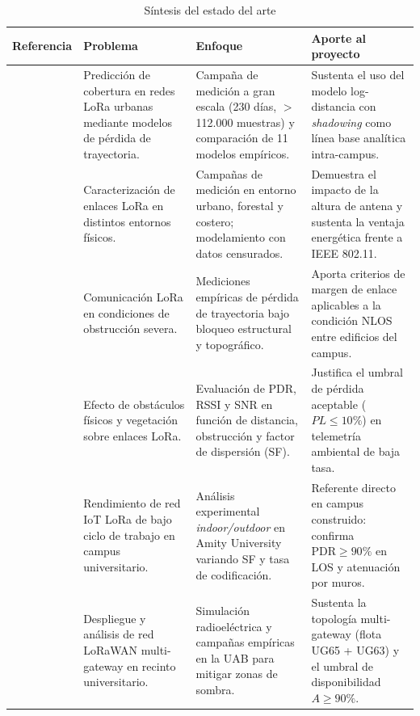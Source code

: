\documentclass[12pt,oneside,openany,spanish,oldfontcommands]{memoir}
\begin{document}
\begin{table}[!htbp]
\centering
\caption{Síntesis del estado del arte}
\label{tab:estado-arte}
\scriptsize
\begin{tabularx}{\textwidth}{p{2.5cm} X X X}
\toprule
\textbf{Referencia} & \textbf{Problema} & \textbf{Enfoque} & \textbf{Aporte al proyecto}\\
\midrule
\textcite{rademacher2021}
&
Predicción de cobertura en redes LoRa urbanas mediante modelos de pérdida de trayectoria.
&
Campaña de medición a gran escala (230 días, $>$112.000 muestras) y comparación de 11 modelos empíricos.
&
Sustenta el uso del modelo log-distancia con \textit{shadowing} como línea base analítica intra-campus.
\\
\midrule
\textcite{callebaut2020}
&
Caracterización de enlaces LoRa en distintos entornos físicos.
&
Campañas de medición en entorno urbano, forestal y costero; modelamiento con datos censurados.
&
Demuestra el impacto de la altura de antena y sustenta la ventaja energética frente a IEEE 802.11.
\\
\midrule
\textcite{bianco2021}
&
Comunicación LoRa en condiciones de obstrucción severa.
&
Mediciones empíricas de pérdida de trayectoria bajo bloqueo estructural y topográfico.
&
Aporta criterios de margen de enlace aplicables a la condición NLOS entre edificios del campus.
\\
\midrule
\textcite{ahmed2024vegetacion}
&
Efecto de obstáculos físicos y vegetación sobre enlaces LoRa.
&
Evaluación de PDR, RSSI y SNR en función de distancia, obstrucción y factor de dispersión (SF).
&
Justifica el umbral de pérdida aceptable ($PL \leq 10\%$) en telemetría ambiental de baja tasa.
\\
\midrule
\textcite{kaur2024campus}
&
Rendimiento de red IoT LoRa de bajo ciclo de trabajo en campus universitario.
&
Análisis experimental \textit{indoor/outdoor} en Amity University variando SF y tasa de codificación.
&
Referente directo en campus construido: confirma $\text{PDR} \geq 90\%$ en LOS y atenuación por muros.
\\
\midrule
\textcite{barrachina2023campus}
&
Despliegue y análisis de red LoRaWAN multi-gateway en recinto universitario.
&
Simulación radioeléctrica y campañas empíricas en la UAB para mitigar zonas de sombra.
&
Sustenta la topología multi-gateway (flota UG65 + UG63) y el umbral de disponibilidad $A \geq 90\%$.
\\
\bottomrule
\end{tabularx}
\end{table}
\end{document}
